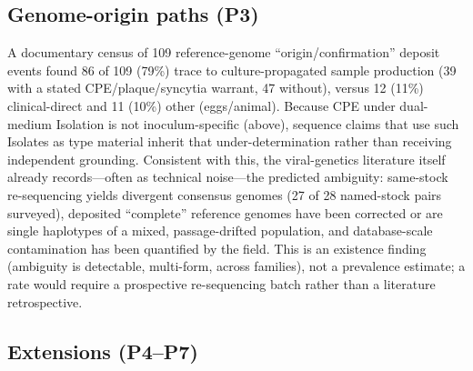 \subsection*{Genome-origin paths (P3)}
A documentary census of 109 reference-genome ``origin/confirmation'' deposit events found 86 of 109 (79\%) trace to culture-propagated sample production (39 with a stated CPE/plaque/syncytia warrant, 47 without), versus 12 (11\%) clinical-direct and 11 (10\%) other (eggs/animal). Because CPE under dual-medium Isolation is not inoculum-specific (above), sequence claims that use such Isolates as type material inherit that under-determination rather than receiving independent grounding. Consistent with this, the viral-genetics literature itself already records---often as technical noise---the predicted ambiguity: same-stock re-sequencing yields divergent consensus genomes (27 of 28 named-stock pairs surveyed), deposited ``complete'' reference genomes have been corrected or are single haplotypes of a mixed, passage-drifted population, and database-scale contamination has been quantified by the field. This is an existence finding (ambiguity is detectable, multi-form, across families), not a prevalence estimate; a rate would require a prospective re-sequencing batch rather than a literature retrospective. 

\subsection*{Extensions (P4--P7)}

